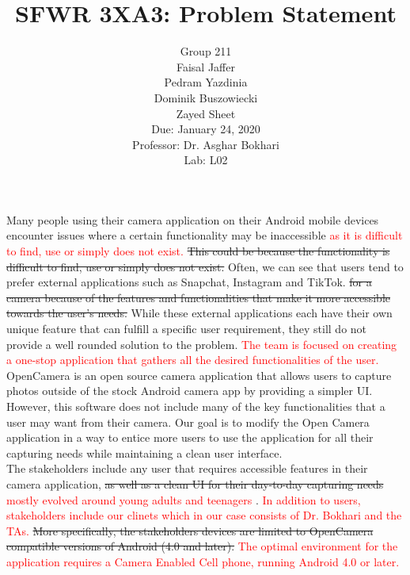 \documentclass[12pt, oneside]{article}
\title{SFWR 3XA3: Problem Statement}
\author{Group 211
		\\ Faisal Jaffer
		\\ Pedram Yazdinia
		\\ Dominik Buszowiecki
		\\ Zayed Sheet
		\\ Due: January 24, 2020
		\\Professor: Dr. Asghar Bokhari
		\\ Lab: L02}
\date{}
\begin{document}
\maketitle

Many people using their camera application on their Android mobile devices encounter issues where a certain functionality may be inaccessible \textcolor{red}{as it is difficult to find, use or simply does not exist.} \sout{This could be because the functionality is difficult to find, use or simply does not exist.} Often, we can see that users tend to prefer external applications such as Snapchat, Instagram and TikTok. \sout{for a camera because of the features and functionalities that make it more accessible towards the user’s needs.} While these external applications each have their own unique feature that can fulfill a specific user requirement, they still do not provide a well rounded solution to the problem. \textcolor{red}{The team is focused on creating a one-stop application that gathers all the desired functionalities of the user.}
\\

OpenCamera is an open source camera application that allows users to capture photos outside of the stock Android camera app by providing a simpler UI. However, this software does not include many of the key functionalities that a user may want from their camera. Our goal is to modify the Open Camera application in a way to entice more users to use the application for all their capturing needs while maintaining a clean user interface. 
\\

The stakeholders include any user that requires accessible features in their camera application, \sout{as well as a clean UI for their day-to-day capturing needs} \textcolor{red}{mostly evolved around young adults and teenagers} . \textcolor{red}{In addition to users, stakeholders include our clinets which in our case consists of Dr. Bokhari and the TAs.} \sout{More specifically, the stakeholders devices are limited to OpenCamera compatible versions of Android (4.0 and later).} \textcolor{red}{The optimal environment for the application requires a Camera Enabled Cell phone, running Android 4.0 or later.}
    



\end{document}

